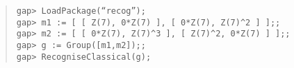 \documentclass[a4paper,11pt]{article}
\theoremstyle{bla}
\begin{document}
\begin{quote}

\hspace*{-1cm} \texttt{gap> LoadPackage(``recog'');}\\
\hspace*{-1cm} \texttt{gap> m1 := [ [ Z(7), 0*Z(7) ], [ 0*Z(7), Z(7)\^{}2 ] ];;}\\
\hspace*{-1cm} \texttt{gap> m2 := [ [ 0*Z(7), Z(7)\^{}3 ], [ Z(7)\^{}2, 0*Z(7) ] ];;}\\
\hspace*{-1cm} \texttt{gap> g := Group([m1,m2]);;}\\
\hspace*{-1cm} \texttt{gap> RecogniseClassical(g);}\\


\end{quote}
\end{document}

